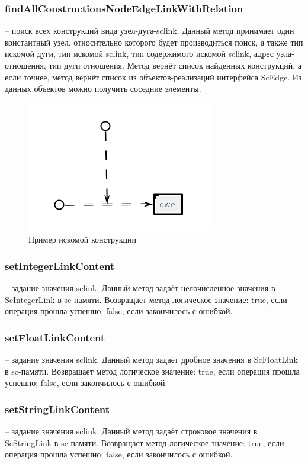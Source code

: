 \subsubsection {findAllConstructionsNodeEdgeLinkWithRelation} -- поиск всех конструкций вида узел-дуга-sclink. Данный метод принимает один константный узел, относительно которого будет производиться поиск, а также тип искомой дуги, тип искомой sclink, тип содержимого искомой sclink, адрес узла-отношения, тип дуги отношения. Метод вернёт список найденных конструкций, а если точнее, метод вернёт список из объектов-реализаций интерфейса ScEdge. Из данных объектов можно получить соседние элементы. 
\begin{figure}[H]
    \centering
    \includegraphics{images/sc-context/node-edge-link-with-rel.png}
    \caption{Пример искомой конструкции}
    \label{json_ex}
\end{figure}

\subsubsection {setIntegerLinkContent} -- задание значения sclink. Данный метод задаёт целочисленное значения в ScIntegerLink в sc-памяти. Возвращает метод логическое значение: true, если операция прошла успешно; false, если закончилось с ошибкой. 
\subsubsection {setFloatLinkContent} -- задание значения sclink. Данный метод задаёт дробное значения в ScFloatLink в sc-памяти. Возвращает метод логическое значение: true, если операция прошла успешно; false, если закончилось с ошибкой. 
\subsubsection {setStringLinkContent} -- задание значения sclink. Данный метод задаёт строковое значения в ScStringLink в sc-памяти. Возвращает метод логическое значение: true, если операция прошла успешно; false, если закончилось с ошибкой. 
